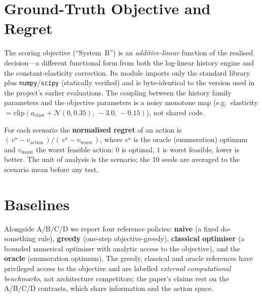 \documentclass[conference]{IEEEtran}
\newcommand{\code}[1]{\texttt{#1}}
\begin{document}
\section{Ground-Truth Objective and Regret}\label{sec:gt}
The scoring objective (``System~B'') is an \emph{additive-linear} function of the
realised decision---a different functional form from both the log-linear history
engine and the constant-elasticity correction. Its module imports only the
standard library plus \code{numpy}/\code{scipy} (statically verified) and is
byte-identical to the version used in the project's earlier evaluations. The
coupling between the history family parameters and the objective parameters is a
noisy monotone map (e.g.\ elasticity
$=\mathrm{clip}(a_{\mathrm{elast}}+\mathcal{N}(0,0.35),\,-3.0,\,-0.15)$), not
shared code.

For each scenario the \textbf{normalised regret} of an action is
$(\,v^\star - v_{\mathrm{action}}\,)/(\,v^\star - v_{\mathrm{worst}}\,)$, where
$v^\star$ is the oracle (enumeration) optimum and $v_{\mathrm{worst}}$ the worst
feasible action: $0$ is optimal, $1$ is worst feasible, lower is better. The
unit of analysis is the scenario; the 10 seeds are averaged to the scenario mean
before any test.

\section{Baselines}\label{sec:baselines}
Alongside A/B/C/D we report four reference policies: \textbf{naive} (a fixed
do-something rule), \textbf{greedy} (one-step objective-greedy),
\textbf{classical optimiser} (a bounded numerical optimiser with analytic access
to the objective), and the \textbf{oracle} (enumeration optimum). The greedy,
classical and oracle references have privileged access to the objective and are
labelled \emph{external computational benchmarks}, not architecture competitors;
the paper's claims rest on the A/B/C/D contrasts, which share information and the
action space.

\end{document}

